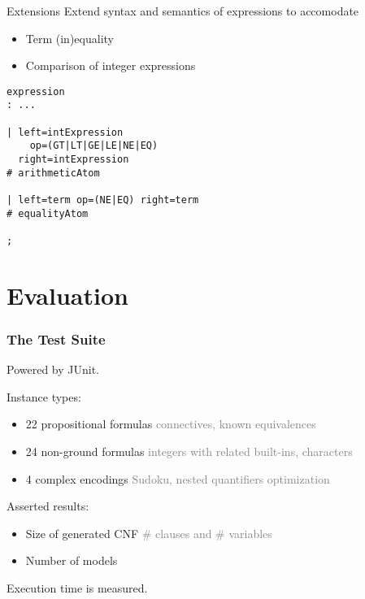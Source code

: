 \documentclass[smaller,dvipsnames,ratio=169]{beamer}
\begin{document}
  
  \begin{frame}[fragile]{Extensions}
    Extend syntax and semantics of expressions to accomodate
    \begin{itemize}
      \item Term (in)\alert{equality}
      \item \alert{Comparison} of integer expressions
    \end{itemize}
    \begin{verbatim}
expression
: ...

| left=intExpression
    op=(GT|LT|GE|LE|NE|EQ)
  right=intExpression
# arithmeticAtom

| left=term op=(NE|EQ) right=term
# equalityAtom

;
    \end{verbatim}
\end{frame}

  \section{Evaluation}

  \begin{frame}
    \frametitle{The Test Suite}
    Powered by \alert{JUnit}.

    Instance types:
    \begin{itemize}
      \item 22 propositional formulas \textcolor{gray}{connectives, known equivalences}
      \item 24 non-ground formulas \textcolor{gray}{integers with related built-ins, characters}
      \item 4 complex encodings \textcolor{gray}{Sudoku, nested quantifiers optimization}
    \end{itemize}
    Asserted results:
    \begin{itemize}
      \item \alert{Size} of generated CNF \textcolor{gray}{\# clauses and \# variables}
      \item Number of \alert{models}
    \end{itemize}
    Execution \alert{time} is measured.
  \end{frame}
\end{document}
